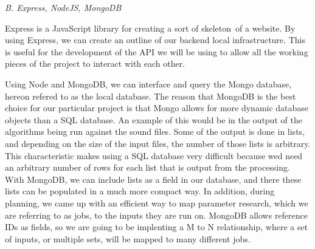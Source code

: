 \begin{flushleft}
\noindent\textit{B. Express, NodeJS, MongoDB}\par
Express is a JavaScript library for creating a sort of \textquotesingle skeleton\textquotesingle\ of a website. By using Express, we can create an outline of our backend local infrastructure. This is useful for the development of the API we will be using to allow all the working pieces of the project to interact with each other.\par
Using Node and MongoDB, we can interface and query the Mongo database, hereon refered to as the local database. The reason that MongoDB is the best choice for our particular project is that Mongo allows for more dynamic database objects than a SQL database. An example of this would be in the output of the algorithms being run against the sound files. Some of the output is done in lists, and depending on the size of the input files, the number of those lists is arbitrary. This characteristic makes using a SQL database very difficult because we\textquotesingle d need an arbitrary number of rows for each list that is output from the processing. With MongoDB, we can include lists as a field in our database, and there these lists can be populated in a much more compact way. In addition, during planning, we came up with an efficient way to map parameter research, which we are referring to as jobs, to the inputs they are run on. MongoDB allows reference IDs as fields, so we are going to be implenting a M to N relationship, where a set of inputs, or multiple sets, will be mapped to many different jobs.\par

\end{flushleft}
